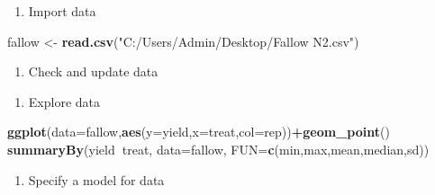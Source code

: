 \documentclass[]{book}
\newenvironment{Shaded}{\begin{snugshade}}{\end{snugshade}}
\newcommand{\KeywordTok}[1]{\textcolor[rgb]{0.13,0.29,0.53}{\textbf{#1}}}
\newcommand{\DataTypeTok}[1]{\textcolor[rgb]{0.13,0.29,0.53}{#1}}
\newcommand{\StringTok}[1]{\textcolor[rgb]{0.31,0.60,0.02}{#1}}
\newcommand{\OperatorTok}[1]{\textcolor[rgb]{0.81,0.36,0.00}{\textbf{#1}}}
\newcommand{\NormalTok}[1]{#1}
\providecommand{\tightlist}{%
  \setlength{\itemsep}{0pt}\setlength{\parskip}{0pt}}
\theoremstyle{definition}
\theoremstyle{definition}
\theoremstyle{definition}
\theoremstyle{remark}
\begin{document}
\begin{enumerate}
\def\labelenumi{\arabic{enumi}.}
\setcounter{enumi}{1}
\tightlist
\item
  Import data
\end{enumerate}

\begin{Shaded}
\begin{Highlighting}[]
\NormalTok{fallow <-}\StringTok{ }\KeywordTok{read.csv}\NormalTok{(}\StringTok{"C:/Users/Admin/Desktop/Fallow N2.csv"}\NormalTok{)}
\end{Highlighting}
\end{Shaded}

\begin{enumerate}
\def\labelenumi{\arabic{enumi}.}
\setcounter{enumi}{2}
\tightlist
\item
  Check and update data
\end{enumerate}

\begin{Shaded}
\end{Shaded}

\begin{enumerate}
\def\labelenumi{\arabic{enumi}.}
\setcounter{enumi}{3}
\tightlist
\item
  Explore data
\end{enumerate}

\begin{Shaded}
\begin{Highlighting}[]
\KeywordTok{ggplot}\NormalTok{(}\DataTypeTok{data=}\NormalTok{fallow,}\KeywordTok{aes}\NormalTok{(}\DataTypeTok{y=}\NormalTok{yield,}\DataTypeTok{x=}\NormalTok{treat,}\DataTypeTok{col=}\NormalTok{rep))}\OperatorTok{+}\KeywordTok{geom_point}\NormalTok{()}
\KeywordTok{summaryBy}\NormalTok{(yield}\OperatorTok{~}\NormalTok{treat, }\DataTypeTok{data=}\NormalTok{fallow, }\DataTypeTok{FUN=}\KeywordTok{c}\NormalTok{(min,max,mean,median,sd))}
\end{Highlighting}
\end{Shaded}

\begin{enumerate}
\def\labelenumi{\arabic{enumi}.}
\setcounter{enumi}{4}
\tightlist
\item
  Specify a model for data
\end{enumerate}
\end{document}
